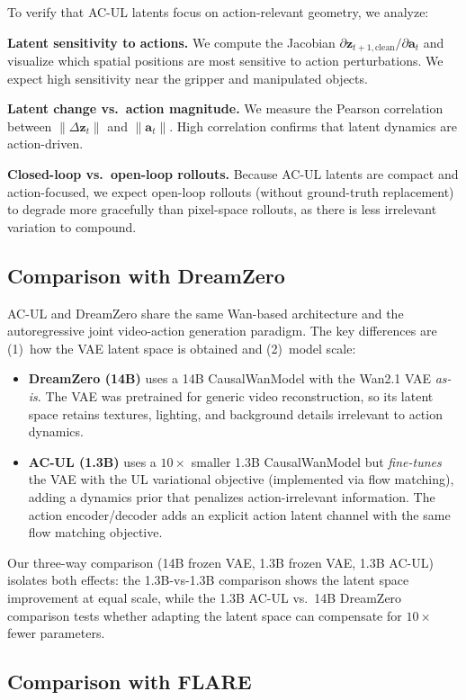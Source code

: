 \documentclass{article}
\newcommand{\vz}{\bm{z}}
\newcommand{\va}{\bm{a}}
\begin{document}
To verify that AC-UL latents focus on action-relevant geometry, we analyze:

\textbf{Latent sensitivity to actions.}
We compute the Jacobian $\partial \vz_{t+1,\text{clean}} / \partial \va_t$ and visualize which spatial positions are most sensitive to action perturbations. We expect high sensitivity near the gripper and manipulated objects.

\textbf{Latent change vs.\ action magnitude.}
We measure the Pearson correlation between $\|\Delta \vz_t\|$ and $\|\va_t\|$. High correlation confirms that latent dynamics are action-driven.

\textbf{Closed-loop vs.\ open-loop rollouts.}
Because AC-UL latents are compact and action-focused, we expect open-loop rollouts (without ground-truth replacement) to degrade more gracefully than pixel-space rollouts, as there is less irrelevant variation to compound.

\subsection{Comparison with DreamZero}

AC-UL and DreamZero share the same Wan-based architecture and the autoregressive joint video-action generation paradigm. The key differences are (1)~how the VAE latent space is obtained and (2)~model scale:
\begin{itemize}[leftmargin=*,itemsep=2pt]
  \item \textbf{DreamZero (14B)} uses a 14B CausalWanModel with the Wan2.1 VAE \emph{as-is}. The VAE was pretrained for generic video reconstruction, so its latent space retains textures, lighting, and background details irrelevant to action dynamics.
  \item \textbf{AC-UL (1.3B)} uses a $10\times$ smaller 1.3B CausalWanModel but \emph{fine-tunes} the VAE with the UL variational objective (implemented via flow matching), adding a dynamics prior that penalizes action-irrelevant information. The action encoder/decoder adds an explicit action latent channel with the same flow matching objective.
\end{itemize}
Our three-way comparison (14B frozen VAE, 1.3B frozen VAE, 1.3B AC-UL) isolates both effects: the 1.3B-vs-1.3B comparison shows the latent space improvement at equal scale, while the 1.3B AC-UL vs.\ 14B DreamZero comparison tests whether adapting the latent space can compensate for $10\times$ fewer parameters.

\subsection{Comparison with FLARE}
\end{document}
